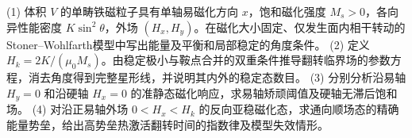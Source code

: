 (1) 体积 \(V\) 的单畴铁磁粒子具有单轴易磁化方向 \(x\)，饱和磁化强度 \(M_s>0\)，各向异性能密度 \(K\sin^2\theta\)，外场 \((H_x,H_y)\)。在磁化大小固定、仅发生面内相干转动的Stoner–Wohlfarth模型中写出能量及平衡和局部稳定的角度条件。
(2) 定义 \(H_k=2K/(\mu_0M_s)\)。由稳定极小与鞍点合并的双重条件推导翻转临界场的参数方程，消去角度得到完整星形线，并说明其内外的稳定态数目。
(3) 分别分析沿易轴 \(H_y=0\) 和沿硬轴 \(H_x=0\) 的准静态磁化响应，求易轴矫顽阈值及硬轴无滞后饱和场。
(4) 对沿正易轴外场 \(0<H_x<H_k\) 的反向亚稳磁化态，求通向顺场态的精确能量势垒，给出高势垒热激活翻转时间的指数律及模型失效情形。
